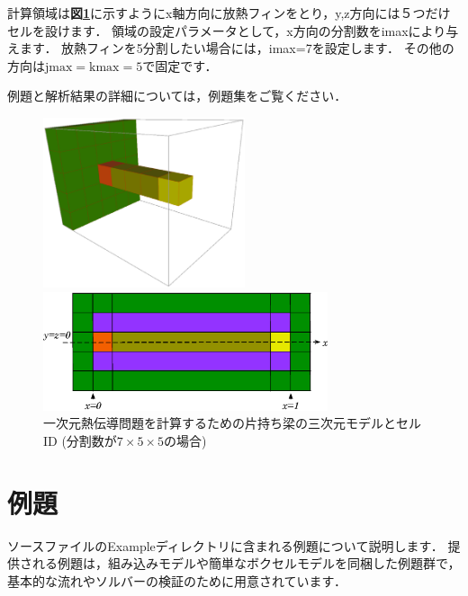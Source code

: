 計算領域は\textbf{図\ref{fig:HC model}}に示すようにx軸方向に放熱フィンをとり，y,z方向には５つだけセルを設けます．
領域の設定パラメータとして，x方向の分割数をimaxにより与えます．
放熱フィンを5分割したい場合には，imax=7を設定します．
その他の方向は$\mathrm{jmax=kmax=5}$で固定です．

例題と解析結果の詳細については，例題集をご覧ください．

\begin{figure}[htdp]
\begin{minipage}{0.47\hsize}
\begin{center}
\includegraphics[height=5cm,clip]{model_iso.eps}
\end{center}
\end{minipage}
\begin{minipage}{0.47\hsize}
\begin{center}
\includegraphics[height=3.5cm,clip]{dimension.eps}
\end{center}
\end{minipage}
\caption{一次元熱伝導問題を計算するための片持ち梁の三次元モデルとセルID (分割数が$7\times5\times5$の場合)}
\label{fig:HC model}
\end{figure}


\pagebreak
% 
\section{例題}
ソースファイルのExampleディレクトリに含まれる\hypertarget{tgt:samples}{例題}について説明します．
提供される例題は，組み込みモデルや簡単なボクセルモデルを同梱した例題群で，
基本的な流れやソルバーの検証のために用意されています．


